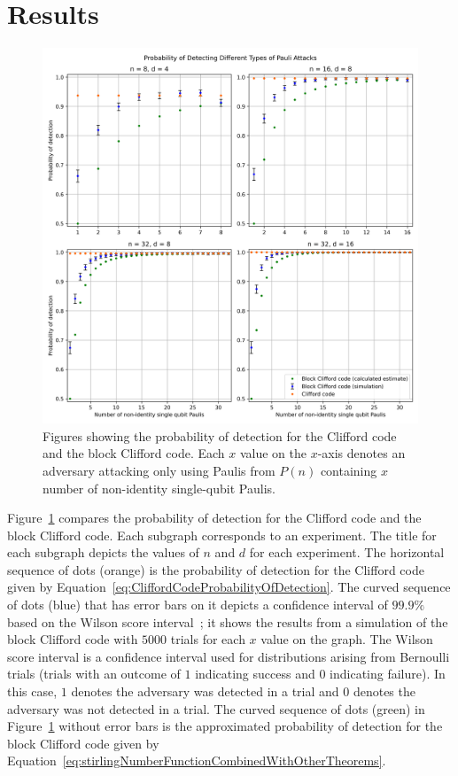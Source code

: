 \section{Results}
\begin{figure}
    \centering
    \includegraphics[scale=0.6]{Figures/multi_graph_pauli_attacks.png}
    \caption{Figures showing the probability of detection for the Clifford code and the block Clifford code. Each $x$ value on the $x$-axis denotes an adversary attacking only using Paulis from $P(n)$ containing $x$ number of non-identity single-qubit Paulis.}
    \label{fig:multiGraphPaulAttacks}
\end{figure}

Figure~\ref{fig:multiGraphPaulAttacks} compares the probability of detection for the Clifford code and the block Clifford code. Each subgraph corresponds to an experiment. The title for each subgraph depicts the values of $n$ and $d$ for each experiment. The horizontal sequence of dots (orange) is the probability of detection for the Clifford code given by Equation~\eqref{eq:CliffordCodeProbabilityOfDetection}. The curved sequence of dots (blue) that has error bars on it depicts a confidence interval of $99.9 \%$ based on the Wilson score interval~\cite{wilsonScoreInterval}; it shows the results from a simulation of the block Clifford code with $5000$ trials for each $x$ value on the graph. The Wilson score interval is a confidence interval used for distributions arising from Bernoulli trials (trials with an outcome of $1$ indicating success and $0$ indicating failure). In this case, $1$ denotes the adversary was detected in a trial and $0$ denotes the adversary was not detected in a trial. The curved sequence of dots (green) in Figure~\ref{fig:multiGraphPaulAttacks} without error bars is the approximated probability of detection for the block Clifford code given by Equation~\eqref{eq:stirlingNumberFunctionCombinedWithOtherTheorems}. 

